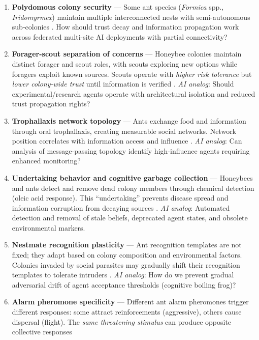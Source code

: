 \documentclass[
]{article}
\begin{document}
\begin{enumerate}
\def\labelenumi{\arabic{enumi}.}
\item
  \textbf{Polydomous colony security} --- Some ant species
  (\emph{Formica} spp., \emph{Iridomyrmex}) maintain multiple
  interconnected nests with semi-autonomous sub-colonies
  \citep{debout2007polydomy}. How should trust decay and information
  propagation work across federated multi-site AI deployments with
  partial connectivity?
\item
  \textbf{Forager-scout separation of concerns} --- Honeybee colonies
  maintain distinct forager and scout roles, with scouts exploring new
  options while foragers exploit known sources. Scouts operate with
  \emph{higher risk tolerance} but \emph{lower colony-wide trust} until
  information is verified \citep{seeley2010honeybee}. \emph{AI analog}:
  Should experimental/research agents operate with architectural
  isolation and reduced trust propagation rights?
\item
  \textbf{Trophallaxis network topology} --- Ants exchange food and
  information through oral trophallaxis, creating measurable social
  networks. Network position correlates with information access and
  influence \citep{sendova2010social}. \emph{AI analog}: Can analysis of
  message-passing topology identify high-influence agents requiring
  enhanced monitoring?
\item
  \textbf{Undertaking behavior and cognitive garbage collection} ---
  Honeybees and ants detect and remove dead colony members through
  chemical detection (oleic acid response). This ``undertaking''
  prevents disease spread and information corruption from decaying
  sources \citep{wilson1958chemical}. \emph{AI analog}: Automated
  detection and removal of stale beliefs, deprecated agent states, and
  obsolete environmental markers.
\item
  \textbf{Nestmate recognition plasticity} --- Ant recognition templates
  are not fixed; they adapt based on colony composition and
  environmental factors. Colonies invaded by social parasites may
  gradually shift their recognition templates to tolerate intruders
  \citep{lorenzi2011nestmate}. \emph{AI analog}: How do we prevent
  gradual adversarial drift of agent acceptance thresholds (cognitive
  boiling frog)?
\item
  \textbf{Alarm pheromone specificity} --- Different ant alarm
  pheromones trigger different responses: some attract reinforcements
  (aggressive), others cause dispersal (flight). The \emph{same
  threatening stimulus} can produce opposite collective responses

\end{enumerate}
\end{document}
